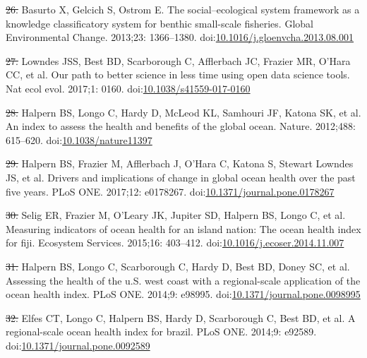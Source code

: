 \documentclass[12pt,]{article}
\providecommand{\DIFaddtex}[1]{{\protect\color{blue}\uwave{#1}}} %
\providecommand{\DIFdeltex}[1]{{\protect\color{red}\sout{#1}}}                      %
\providecommand{\DIFaddbegin}{} %
\providecommand{\DIFaddend}{} %
\providecommand{\DIFdelbegin}{} %
\providecommand{\DIFdelend}{} %
\providecommand{\DIFadd}[1]{\texorpdfstring{\DIFaddtex{#1}}{#1}} %
\providecommand{\DIFdel}[1]{\texorpdfstring{\DIFdeltex{#1}}{}} %
\newcommand{\DIFscaledelfig}{0.5}
\newlength{\DIFdelgraphicswidth} %
\newlength{\DIFdelgraphicsheight} %
\newcommand{\DIFaddincludegraphics}[2][]{{\color{blue}\fbox{\DIFOincludegraphics[#1]{#2}}}} %
\newcommand{\DIFdelincludegraphics}[2][]{%
\sbox{\DIFdelgraphicsbox}{\DIFOincludegraphics[#1]{#2}}%
\settoboxwidth{\DIFdelgraphicswidth}{\DIFdelgraphicsbox} %
\settoboxtotalheight{\DIFdelgraphicsheight}{\DIFdelgraphicsbox} %
\scalebox{\DIFscaledelfig}{%
\parbox[b]{\DIFdelgraphicswidth}{\usebox{\DIFdelgraphicsbox}\\[-\baselineskip] \rule{\DIFdelgraphicswidth}{0em}}\llap{\resizebox{\DIFdelgraphicswidth}{\DIFdelgraphicsheight}{%
\setlength{\unitlength}{\DIFdelgraphicswidth}%
\begin{picture}(1,1)%
\thicklines\linethickness{2pt} %
{\color[rgb]{1,0,0}\put(0,0){\framebox(1,1){}}}%
{\color[rgb]{1,0,0}\put(0,0){\line( 1,1){1}}}%
{\color[rgb]{1,0,0}\put(0,1){\line(1,-1){1}}}%
\end{picture}%
}\hspace*{3pt}}} %
} %
\DeclareRobustCommand{\DIFaddbegin}{\DIFOaddbegin \let\includegraphics\DIFaddincludegraphics} %
\DeclareRobustCommand{\DIFaddend}{\DIFOaddend \let\includegraphics\DIFOincludegraphics} %
\DeclareRobustCommand{\DIFdelbegin}{\DIFOdelbegin \let\includegraphics\DIFdelincludegraphics} %
\DeclareRobustCommand{\DIFdelend}{\DIFOaddend \let\includegraphics\DIFOincludegraphics} %
\begin{document}
\hypertarget{ref-basurto_2013-oq}{}
\DIFdelbegin \DIFdel{26. }\DIFdelend \DIFaddbegin \DIFadd{27. }\DIFaddend Basurto X, Gelcich S, Ostrom E. The social--ecological system
framework as a knowledge classificatory system for benthic small-scale
fisheries. Global Environmental Change. 2013;23: 1366--1380.
doi:\href{https://doi.org/10.1016/j.gloenvcha.2013.08.001}{10.1016/j.gloenvcha.2013.08.001}

\hypertarget{ref-lowndes_2017-xh}{}
\DIFdelbegin \DIFdel{27. }\DIFdelend \DIFaddbegin \DIFadd{28. }\DIFaddend Lowndes JSS, Best BD, Scarborough C, Afflerbach JC, Frazier MR,
O'Hara CC, et al. Our path to better science in less time using open
data science tools. Nat ecol evol. 2017;1: 0160.
doi:\href{https://doi.org/10.1038/s41559-017-0160}{10.1038/s41559-017-0160}

\hypertarget{ref-halpern_2012-k9}{}
\DIFdelbegin \DIFdel{28. }\DIFdelend \DIFaddbegin \DIFadd{29. }\DIFaddend Halpern BS, Longo C, Hardy D, McLeod KL, Samhouri JF, Katona SK, et
al. An index to assess the health and benefits of the global ocean.
Nature. 2012;488: 615--620.
doi:\href{https://doi.org/10.1038/nature11397}{10.1038/nature11397}

\hypertarget{ref-halpern_2017-Zi}{}
\DIFdelbegin \DIFdel{29. }\DIFdelend \DIFaddbegin \DIFadd{30. }\DIFaddend Halpern BS, Frazier M, Afflerbach J, O'Hara C, Katona S, Stewart
Lowndes JS, et al. Drivers and implications of change in global ocean
health over the past five years. PLoS ONE. 2017;12: e0178267.
doi:\href{https://doi.org/10.1371/journal.pone.0178267}{10.1371/journal.pone.0178267}

\hypertarget{ref-selig_2015-F9}{}
\DIFdelbegin \DIFdel{30. }\DIFdelend \DIFaddbegin \DIFadd{31. }\DIFaddend Selig ER, Frazier M, O'Leary JK, Jupiter SD, Halpern BS, Longo C, et
al. Measuring indicators of ocean health for an island nation: The ocean
health index for fiji. Ecosystem Services. 2015;16: 403--412.
doi:\href{https://doi.org/10.1016/j.ecoser.2014.11.007}{10.1016/j.ecoser.2014.11.007}

\hypertarget{ref-halpern_2014-lQ}{}
\DIFdelbegin \DIFdel{31. }\DIFdelend \DIFaddbegin \DIFadd{32. }\DIFaddend Halpern BS, Longo C, Scarborough C, Hardy D, Best BD, Doney SC, et
al. Assessing the health of the u.S. west coast with a regional-scale
application of the ocean health index. PLoS ONE. 2014;9: e98995.
doi:\href{https://doi.org/10.1371/journal.pone.0098995}{10.1371/journal.pone.0098995}

\hypertarget{ref-elfes_2014-RC}{}
\DIFdelbegin \DIFdel{32. }\DIFdelend \DIFaddbegin \DIFadd{33. }\DIFaddend Elfes CT, Longo C, Halpern BS, Hardy D, Scarborough C, Best BD, et
al. A regional-scale ocean health index for brazil. PLoS ONE. 2014;9:
e92589.
doi:\href{https://doi.org/10.1371/journal.pone.0092589}{10.1371/journal.pone.0092589}
\end{document}
